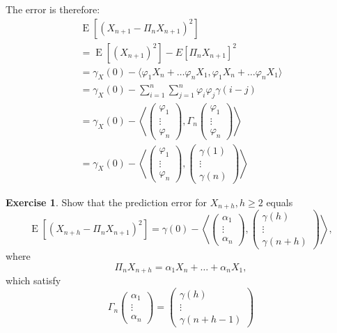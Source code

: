 \documentclass[12pt,a4paper, notitlepage]{book}
\theoremstyle{definition} %
\newtheorem{exercise}{Exercise}[chapter]
\theoremstyle{plain} %
\DeclareMathOperator{\E}{E}
\begin{document}
The error is therefore:
\begin{align*}
 \E\left[(X_{n+1} - \Pi_n X_{n+1})^2\right]  \\ 
= \E\left[ (X_{n+1})^2\right] - E\left[\Pi_n X_{n+1}\right] ^2  \\ 
= \gamma_X (0) - \langle \varphi_1 X_n + \ldots \varphi _n X_1, \varphi _1 X_n + \ldots \varphi _n X_1 \rangle \\
= \gamma_X(0) - \sum_{i=1} ^n \sum_{j=1} ^n  \varphi_i \varphi_j \gamma(i-j)    \\
 = \gamma_X(0) - \left<  \left( \begin{array}{c} \varphi _1 \\ \vdots \\ \varphi _n \end{array}  \right) ,  \Gamma_n   \left( \begin{array}{c} \varphi _1 \\ \vdots \\ \varphi _n \end{array} \right) \right>  \\
 = \gamma_X(0) - \left<  \left( \begin{array}{c} \varphi _1 \\ \vdots \\ \varphi _n \end{array}  \right) ,     \left( \begin{array}{c} \gamma (1) \\ \vdots \\ \gamma(n) \end{array} \right) \right>  
\end{align*}

\begin{exercise}
Show that the prediction error for $X_{n+h}, h \geq 2$ equals 
\[ \E \left[ (X_{n+h}- \Pi_nX_{n+1})^2 \right]  = \gamma(0) - \left< \left( \begin{array} {c} \alpha _1 \\ \vdots \\ \alpha _n \end{array} \right) , \left( \begin{array} {c} \gamma(h) \\  \vdots \\ \gamma(n+h) \end{array} \right) \right> ,\]
where 
\[ \Pi_n X_{n+h} = \alpha_1 X_n + \dots + \alpha_n X_1, \]
which satisfy 
\[ \Gamma_n \left( \begin{array} {c} \alpha_1 \\ \vdots \\ \alpha _n \end{array} \right) 
 = \left( \begin{array} {c} \gamma(h) \\ \vdots \\ \gamma(n+h-1) \end{array} \right)  \]
\end{exercise}
\end{document}
